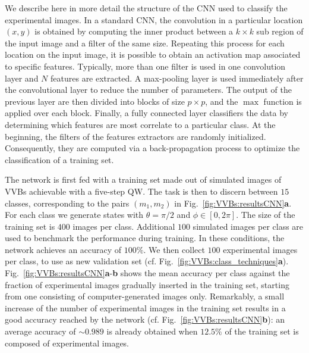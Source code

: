 We describe here in more detail the structure of the \ac{CNN} used to classify the experimental images.
In a standard \ac{CNN}, the convolution in a particular location $(x,y)$ is obtained by computing the inner product between a $k \times k$ sub region of the input image and a filter of the same size. Repeating this process for each location on the input image, it is possible to obtain an activation map associated to specific features. Typically, more than one filter is used in one convolution layer and $N$ features are extracted.
A max-pooling layer is used immediately after the convolutional layer to reduce the number of parameters. The output of the previous layer are then divided into blocks of size $p \times p$, and the $\max$ function is applied over each block.
Finally, a fully connected layer classifiers the data by determining which features are most correlate to a particular class.
At the beginning, the filters of the features extractors are randomly initialized. Consequently, they are computed via a back-propagation process to optimize the classification of a training set.

The network is first fed with a training set made out of simulated images of \acp{VVB} achievable with a five-step \ac{QW}.
The task is then to discern between $15$ classes, corresponding to the pairs $(m_1,m_2)$ in Fig.~\ref{fig:VVBs:resultsCNN}\textbf{a}.
For each class we generate states with $\theta=\pi/2$ and $\phi\in[0,2\pi]$. The size of the training set is $400$ images per class. Additional $100$ simulated images per class are used to benchmark the performance during training. In these conditions, the network achieves an accuracy of $100\%$. 
We then collect $100$ experimental images per class, to use as new validation set (cf. Fig.~\ref{fig:VVBs:class_techniques}{\bf a}). Fig.~\ref{fig:VVBs:resultsCNN}{\bf a}-{\bf b} shows the mean accuracy per class against the fraction of experimental images gradually inserted in the training set, starting from one consisting of computer-generated images only.
Remarkably, a small increase of the number of experimental images in the training set results in a good accuracy reached by the network (cf. Fig.~\ref{fig:VVBs:resultsCNN}{\bf b}): an average accuracy of $\sim 0.989$ is already obtained when $12.5\%$ of the training set is composed of experimental images.


